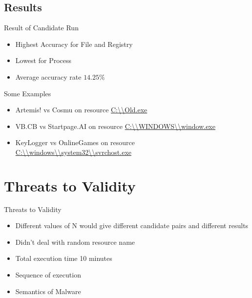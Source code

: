 \documentclass{beamer}
\begin{document}
\subsection{Results}
\label{sub:Results}
\begin{frame}[t]{Result of Candidate Run}
\begin{itemize}
  \item Highest Accuracy for File and Registry
  \item Lowest for Process
  \item Average accuracy rate $14.25\%$
\end{itemize}
\end{frame}
\begin{frame}{Some Examples}
  \begin{itemize}
    \item Artemis! vs Cosmu on resource \url{C:\\Old.exe}
    \item VB.CB vs Startpage.AI on resource \url{C:\\WINDOWS\\window.exe}
    \item KeyLogger vs OnlineGames on resource \url{C:\\windows\\system32\\svrchost.exe}
  \end{itemize}
\end{frame}
\section{Threats to Validity}
\begin{frame}{Threats to Validity}
  \begin{itemize}
    \item Different values of N would give different candidate pairs and different results
    \item Didn't deal with random resource name
    \item Total execution time 10 minutes
    \item Sequence of execution
    \item Semantics of Malware
  \end{itemize}
\end{frame}
\end{document}
